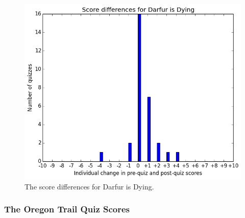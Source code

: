 			\begin{figure}[h] 
			\centering 
			\includegraphics[height=0.33\textheight]{darfur_results.png} 
			\caption{The score differences for Darfur is Dying.}
			\end{figure}


	\cleardoublepage

		\subsubsection{The Oregon Trail Quiz Scores}

			

